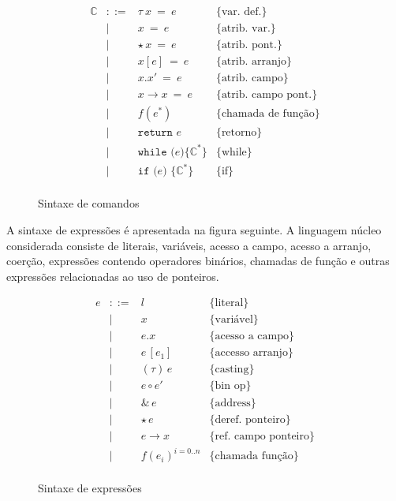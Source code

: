 \documentclass[a4paper,8pt]{article}
\begin{document}
     \begin{figure}[h]
       \[
         \begin{array}{lcll}
           \mathbb{C} & ::=   & \tau\:x\:=\:e & \{\text{var. def.}\} \\
             & \mid & x\:=\:e & \{\text{atrib. var.}\} \\
             & \mid & \star\,x\:=\:e & \{\text{atrib. pont.}\} \\
             & \mid & x[e]\:=\:e &\{\text{atrib. arranjo}\} \\
             & \mid & x.x'\: = \: e & \{\text{atrib. campo}\} \\
             & \mid & x\to x\: = \: e & \{\text{atrib. campo pont.}\}\\
             & \mid & f(e^*) & \{\text{chamada de função}\} \\
             & \mid & \texttt{return }e & \{\text{retorno}\} \\
             & \mid & \texttt{while (}e \texttt{)\{} \mathbb{C}^*
                      \texttt{\}} & \{\text{while}\} \\
             & \mid & \texttt{if (} e \texttt{) \{}\mathbb{C}^*
                      \texttt{\}} & \{\text{if}\} \\
         \end{array} \]
       \centering
       \caption{Sintaxe de comandos}
       \label{figcmdsyn}
    \end{figure}

    A sintaxe de expressões é apresentada na figura seguinte. A
    linguagem núcleo considerada consiste de literais, variáveis,
    acesso a campo, acesso a arranjo, coerção, expressões contendo
    operadores binários, chamadas de função e outras expressões
    relacionadas ao uso de ponteiros.

    \begin{figure}[h]
       \[
         \begin{array}{lcll}
           e & ::= & l & \{\text{literal}\} \\
             & \mid & x & \{\text{variável}\} \\
             & \mid & e . x & \{\text{acesso a campo}\}\\
             & \mid & e\,[e_1] & \{\text{accesso arranjo}\} \\
             & \mid & (\tau)\,e & \{\text{casting}\} \\
             &\mid & e\circ e' & \{\text{bin op}\} \\
             & \mid & \&\,e & \{\text{address}\} \\
             & \mid & \star\,e & \{\text{deref. ponteiro}\}\\
             & \mid & e \to x & \{\text{ref. campo ponteiro}\}\\
             & \mid & f(e_i)^{i=0..n} & \{\text{chamada função}\}\\
         \end{array} \]
         \centering
         \caption{Sintaxe de expressões}
         \label{exprsyn}
    \end{figure}
\end{document}
